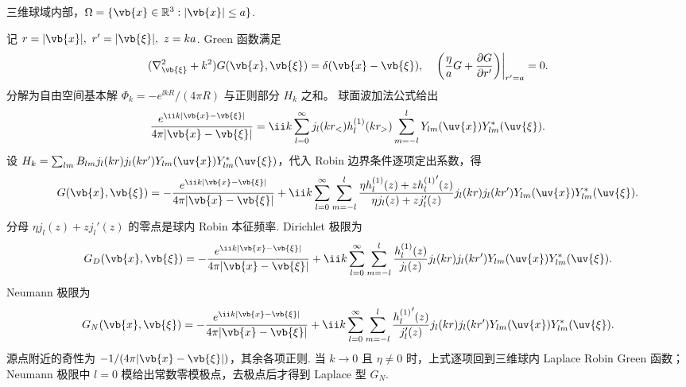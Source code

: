 \begin{exbox}
	三维球域内部，\(\Omega=\{\vb{x}\in\mathbb{R}^3:|\vb{x}|\leq a\}\).
	
	记 \(r=|\vb{x}|,\ r'=|\vb{\xi}|,\ z=ka\). Green 函数满足
	\begin{align*}
		(\nabla_{\vb{\xi}}^2+k^2)G(\vb{x},\vb{\xi})=\delta(\vb{x}-\vb{\xi}),
		\quad
		\left.\left(\frac{\eta}{a}G+\frac{\partial G}{\partial r'}\right)\right|_{r'=a}=0.
	\end{align*}
	分解为自由空间基本解 \(\Phi_k=-e^{\ii kR}/(4\pi R)\) 与正则部分 \(H_k\) 之和。
	球面波加法公式给出
	\begin{align*}
		\frac{e^{\ii k|\vb{x}-\vb{\xi}|}}{4\pi|\vb{x}-\vb{\xi}|}=\ii k\sum_{l=0}^{\infty}j_l(kr_<)h_l^{(1)}(kr_>)\sum_{m=-l}^{l}Y_{lm}(\uv{x})Y_{lm}^*(\uv{\xi}).
	\end{align*}
	设 \(H_k=\sum_{lm}B_{lm}j_l(kr)j_l(kr')Y_{lm}(\uv{x})Y_{lm}^*(\uv{\xi})\)，代入 Robin 边界条件逐项定出系数，得
	\begin{align*}
		G(\vb{x},\vb{\xi})=-\frac{e^{\ii k|\vb{x}-\vb{\xi}|}}{4\pi|\vb{x}-\vb{\xi}|}
		+\ii k\sum_{l=0}^{\infty}\sum_{m=-l}^{l}
		\frac{\eta h_l^{(1)}(z)+z{h_l^{(1)}}'(z)}{\eta j_l(z)+zj_l'(z)}
		j_l(kr)j_l(kr')Y_{lm}(\uv{x})Y_{lm}^*(\uv{\xi}).
	\end{align*}
	分母 \(\eta j_l(z)+zj_l'(z)\) 的零点是球内 Robin 本征频率. Dirichlet 极限为
	\begin{align*}
		G_D(\vb{x},\vb{\xi})=-\frac{e^{\ii k|\vb{x}-\vb{\xi}|}}{4\pi|\vb{x}-\vb{\xi}|}
		+\ii k\sum_{l=0}^{\infty}\sum_{m=-l}^{l}
		\frac{h_l^{(1)}(z)}{j_l(z)}j_l(kr)j_l(kr')Y_{lm}(\uv{x})Y_{lm}^*(\uv{\xi}).
	\end{align*}
	Neumann 极限为
	\begin{align*}
		G_N(\vb{x},\vb{\xi})=-\frac{e^{\ii k|\vb{x}-\vb{\xi}|}}{4\pi|\vb{x}-\vb{\xi}|}
		+\ii k\sum_{l=0}^{\infty}\sum_{m=-l}^{l}
		\frac{{h_l^{(1)}}'(z)}{j_l'(z)}j_l(kr)j_l(kr')Y_{lm}(\uv{x})Y_{lm}^*(\uv{\xi}).
	\end{align*}
	源点附近的奇性为 \(-1/(4\pi|\vb{x}-\vb{\xi}|)\)，其余各项正则. 当 \(k\to0\) 且 \(\eta\neq0\) 时，上式逐项回到三维球内 Laplace Robin Green 函数；Neumann 极限中 \(l=0\) 模给出常数零模极点，去极点后才得到 Laplace 型 \(G_N\).
\end{exbox}

